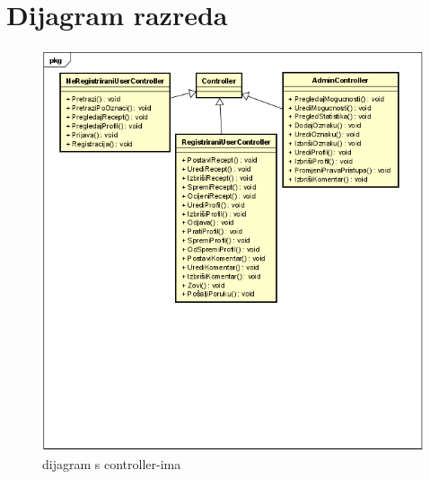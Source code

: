 			 \eject
			
			
		\section{Dijagram razreda}
		\begin{figure}[H]
			\includegraphics[scale=1.3]{slike/dijagram_razreda1.png} %
			\centering
			\caption{dijagram s controller-ima}
			\label{fig:Dijagram_razreda1}
		\end{figure}
